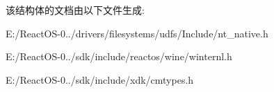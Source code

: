 该结构体的文档由以下文件生成\+:\begin{DoxyCompactItemize}
\item 
E\+:/\+React\+O\+S-\/0../drivers/filesystems/udfs/\+Include/nt\+\_\+native.\+h\item 
E\+:/\+React\+O\+S-\/0../sdk/include/reactos/wine/winternl.\+h\item 
E\+:/\+React\+O\+S-\/0../sdk/include/xdk/cmtypes.\+h\end{DoxyCompactItemize}
